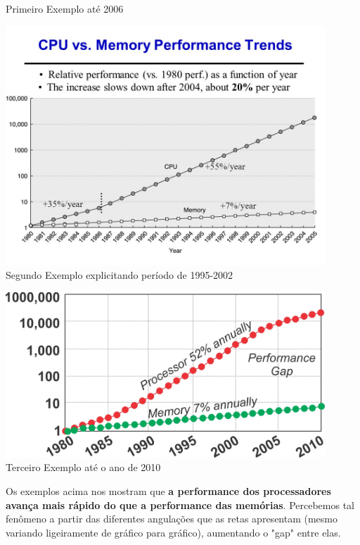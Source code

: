 \documentclass[12pt]{article}
\begin{document}
\begin{itemize}
\begin{minipage}{\linewidth}
  				\newline
  				Primeiro Exemplo até 2006
			\end{minipage}
			\hfill\newline\newline\newline\newline
			\begin{minipage}{\linewidth}
				\centering
  				\includegraphics[width=12cm]{CPU-vs-Memory-Trends.jpg}
  				\newline
  				Segundo Exemplo explicitando período de 1995-2002
			\end{minipage}
			\hfill\newline
			\begin{minipage}{\linewidth}
				\centering
  				\includegraphics[width=12cm]{CPU-vs-Memory-Colorized.jpg}
  				\newline
  				Terceiro Exemplo até o ano de 2010
			\end{minipage}
			\hfill\newline\newline
			Os exemplos acima nos mostram que \textbf{a performance dos 
			processadores avança mais rápido do que a performance
			das memórias}. Percebemos tal fenômeno a partir das diferentes
			angulações que as retas apresentam (mesmo variando ligeiramente
			de gráfico para gráfico), aumentando o "gap" entre
			elas.
	\end{itemize}
		
\end{document}
